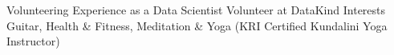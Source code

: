 \begin{additionals}
  \addional
    {Volunteering}
    {Experience as a Data Scientist Volunteer at DataKind}
  \addional
    {Interests}{ Guitar, Health \& Fitness, Meditation \& Yoga (KRI Certified Kundalini Yoga Instructor)}
\end{additionals}


